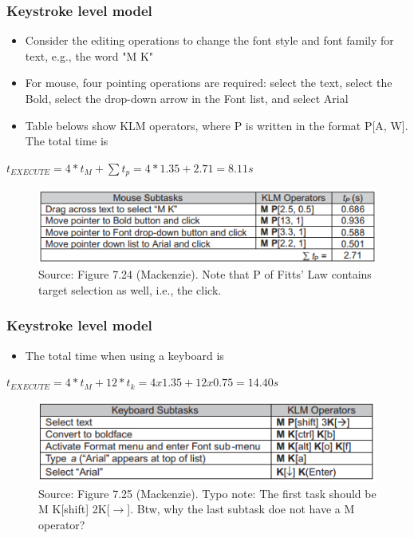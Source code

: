 \documentclass{beamer}
\begin{document}
\begin{frame}
	\frametitle{Keystroke level model}
	\begin{itemize}
		\item Consider the editing operations to change the font style and font family for text, e.g., the word "M K"
		\item For mouse, four pointing operations are required: select the text, select the Bold, select the drop-down arrow in the Font list, and select Arial
		\item Table belows show KLM operators, where P is written in the format P[A, W].  The total time is
	\end{itemize}
	\centering
	$t_{EXECUTE} = 4 * t_{M} + \sum t_{p} = 4 * 1.35 + 2.71 = 8.11s $
	\begin{figure}
		\centering
		\includegraphics[width=.8\linewidth]{image/7-24}
		\caption{Source: Figure 7.24 (Mackenzie).  Note that P of Fitts' Law contains target selection as well, i.e., the click.}
	\end{figure}
\end{frame}

\begin{frame}
	\frametitle{Keystroke level model}
	\begin{itemize}
		\item The total time when using a keyboard is
	\end{itemize}
	\centering
	$t_{EXECUTE} = 4 * t_{M} + 12 * t_{k} = 4 x  1.35 + 12 x 0.75 = 14.40s $
	\begin{figure}
		\centering
		\includegraphics[width=.8\linewidth]{image/7-25}
		\caption{Source: Figure 7.25 (Mackenzie).   Typo note:  The first task should be M K[shift] 2K[$\rightarrow$].   Btw, why the last subtask doe not have a M operator?}
	\end{figure}
\end{frame}

\end{document}
